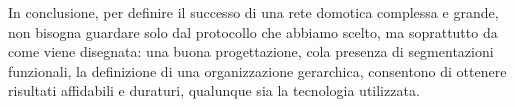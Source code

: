 In conclusione, per definire il successo di una rete domotica complessa e grande, non bisogna guardare solo dal protocollo che abbiamo scelto, ma soprattutto da come viene disegnata: una buona progettazione, cola presenza di segmentazioni funzionali, la definizione di una organizzazione gerarchica, consentono di ottenere risultati affidabili e duraturi, qualunque sia la tecnologia utilizzata.
